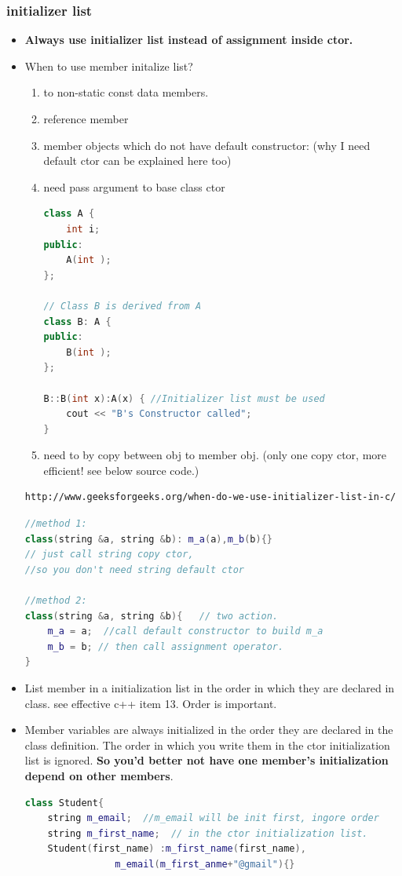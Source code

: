 \documentclass[a4paper,11pt,twoside]{book}
\begin{document}
\subsubsection{initializer list}
\begin{itemize}
\item \textbf{Always use initializer list instead of assignment inside ctor.}

\item When to use member initalize list?
\begin{enumerate}
\item to non-static const data members.
\item reference member
\item  member objects which do not have default constructor: (why I need default ctor can be explained here too)
\item need pass argument to base class ctor
\begin{lstlisting}[frame=single, language=c++]
class A {
    int i;
public:
    A(int );
};

// Class B is derived from A
class B: A {
public:
    B(int );
};

B::B(int x):A(x) { //Initializer list must be used
    cout << "B's Constructor called";
}
\end{lstlisting}

\item need to by copy between obj to member obj. (only one copy ctor, more efficient! see below source code.)
\end{enumerate}

\begin{verbatim}
http://www.geeksforgeeks.org/when-do-we-use-initializer-list-in-c/
\end{verbatim}

\begin{lstlisting}[frame=single, language=c++]
//method 1:
class(string &a, string &b): m_a(a),m_b(b){}
// just call string copy ctor,
//so you don't need string default ctor

//method 2:
class(string &a, string &b){   // two action.
	m_a = a;  //call default constructor to build m_a
	m_b = b; // then call assignment operator.
}
\end{lstlisting}

\item List member in a initialization list in the order in which they are declared in class. see effective c++ item 13. Order is important.

\item Member variables are always initialized in the order they are declared in the class definition. The order in which you write them in the ctor initialization list is ignored.  \textbf{So you'd better not have one member's initialization depend on other members}.
\begin{lstlisting}[frame=single, language=c++]
class Student{
	string m_email;  //m_email will be init first, ingore order
	string m_first_name;  // in the ctor initialization list.
	Student(first_name) :m_first_name(first_name),
                m_email(m_first_anme+"@gmail"){}
\end{lstlisting}



\end{itemize}
\end{document}
